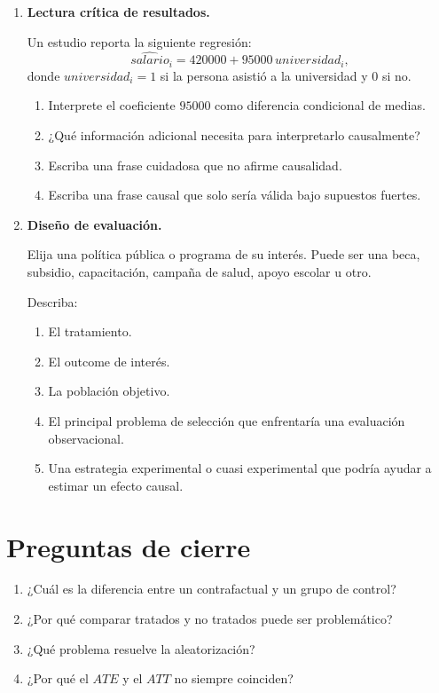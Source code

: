 \documentclass[11pt]{article}
\begin{document}
\begin{enumerate}[label=\textbf{Ejercicio \arabic*.}, leftmargin=*]
\item \textbf{Lectura crítica de resultados.}

Un estudio reporta la siguiente regresión:
\[
\widehat{salario}_i = 420000 + 95000\, universidad_i,
\]
donde $universidad_i=1$ si la persona asistió a la universidad y $0$ si no.

\begin{enumerate}[label=\alph*)]
    \item Interprete el coeficiente $95000$ como diferencia condicional de medias.
    \item ¿Qué información adicional necesita para interpretarlo causalmente?
    \item Escriba una frase cuidadosa que no afirme causalidad.
    \item Escriba una frase causal que solo sería válida bajo supuestos fuertes.
\end{enumerate}

\item \textbf{Diseño de evaluación.}

Elija una política pública o programa de su interés. Puede ser una beca, subsidio, capacitación, campaña de salud, apoyo escolar u otro.

Describa:
\begin{enumerate}[label=\alph*)]
    \item El tratamiento.
    \item El outcome de interés.
    \item La población objetivo.
    \item El principal problema de selección que enfrentaría una evaluación observacional.
    \item Una estrategia experimental o cuasi experimental que podría ayudar a estimar un efecto causal.
\end{enumerate}

\end{enumerate}

\section*{Preguntas de cierre}

\begin{enumerate}[label=\arabic*.]
    \item ¿Cuál es la diferencia entre un contrafactual y un grupo de control?
    \item ¿Por qué comparar tratados y no tratados puede ser problemático?
    \item ¿Qué problema resuelve la aleatorización?
    \item ¿Por qué el $ATE$ y el $ATT$ no siempre coinciden?
\end{enumerate}
\end{document}
